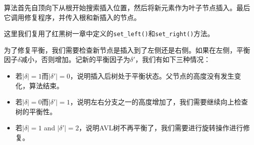 \documentclass[UTF8]{article}
\begin{document}
算法首先自顶向下从根开始搜索插入位置，然后将新元素作为叶子节点插入。最后它调用修复程序，并传入根和新插入的节点。

这里我们复用了红黑树一章中定义的\texttt{set\_left()}和\texttt{set\_right()}方法。

为了修复平衡，我们需要检查新节点是插入到了左侧还是右侧。如果在左侧，平衡因子$\delta$减小，否则增加。记新的平衡因子为$\delta'$，我们有如下三种情况：

\begin{itemize}
\item 若$|\delta| = 1$而$|\delta'| = 0$，说明插入后树处于平衡状态。父节点的高度没有发生变化，算法结束。

\item 若$|\delta| = 0$而$|\delta'| = 1$，说明左右分支之一的高度增加了，我们需要继续向上检查树的平衡性。

\item 若$|\delta| = 1$ and $|\delta'| = 2$，说明AVL树不再平衡了，我们需要进行旋转操作进行修复。
\end{itemize}
\end{document}
